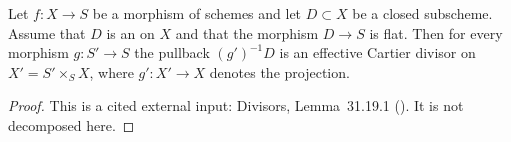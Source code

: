 \begin{lemma}
\label{lem:pc-flat-divisor-pullback-cartier}
Let $f:X\to S$ be a morphism of schemes and let $D\subset X$ be a closed
subscheme.  Assume that $D$ is an
on $X$ and that the morphism $D\to S$ is flat.  Then for every morphism
$g:S'\to S$ the pullback $(g')^{-1}D$ is an effective Cartier divisor on
$X'=S'\times_SX$, where $g':X'\to X$ denotes the projection.
\end{lemma}
\begin{proof}
This is a cited external input: Divisors, Lemma~31.19.1
().  It is not decomposed here.
\end{proof}

